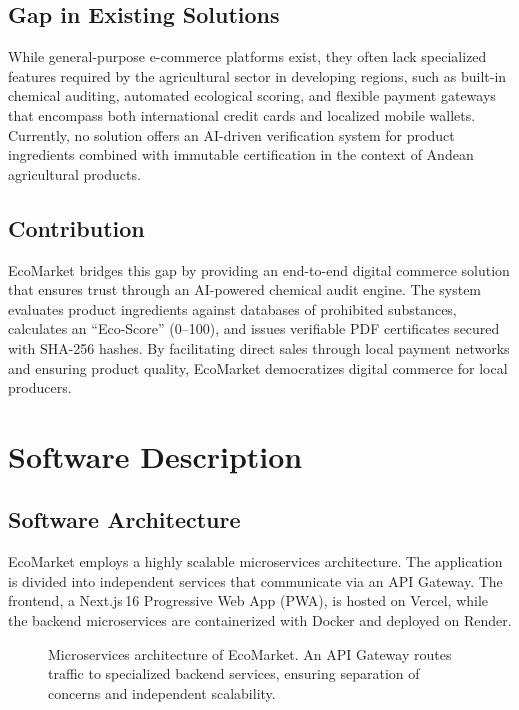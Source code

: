 \documentclass[preprint,12pt,a4paper]{elsarticle}
\begin{document}
\subsection*{Gap in Existing Solutions}

While general-purpose e-commerce platforms exist, they often lack specialized features required by the agricultural sector in developing regions, such as built-in chemical auditing, automated ecological scoring, and flexible payment gateways that encompass both international credit cards and localized mobile wallets. Currently, no solution offers an AI-driven verification system for product ingredients combined with immutable certification in the context of Andean agricultural products.

\subsection*{Contribution}

EcoMarket bridges this gap by providing an end-to-end digital commerce solution that ensures trust through an AI-powered chemical audit engine. The system evaluates product ingredients against databases of prohibited substances, calculates an ``Eco-Score'' (0--100), and issues verifiable PDF certificates secured with SHA-256 hashes. By facilitating direct sales through local payment networks and ensuring product quality, EcoMarket democratizes digital commerce for local producers.

\section{Software Description}

\subsection{Software Architecture}

EcoMarket employs a highly scalable microservices architecture. The application is divided into independent services that communicate via an API Gateway. The frontend, a Next.js\,16 Progressive Web App (PWA), is hosted on Vercel, while the backend microservices are containerized with Docker and deployed on Render.

\begin{figure}[!h]
\centering
{}
\caption{Microservices architecture of EcoMarket. An API Gateway routes traffic to specialized backend services, ensuring separation of concerns and independent scalability.}
\label{fig:arch}
\end{figure}
\end{document}
